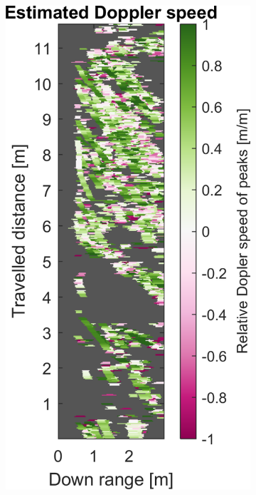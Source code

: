 \begin{figure}[htbp]
\begin{subfigure}[t]{0.475\linewidth}
    \end{subfigure}%
    \hfill%
    \begin{subfigure}[t]{0.475\linewidth}  
        \centering 
        \includegraphics[width=\linewidth,max height=.475\textheight]{gfx/results/homecinema_doppler.png}
    \end{subfigure}\bigskip\\

\end{figure}
